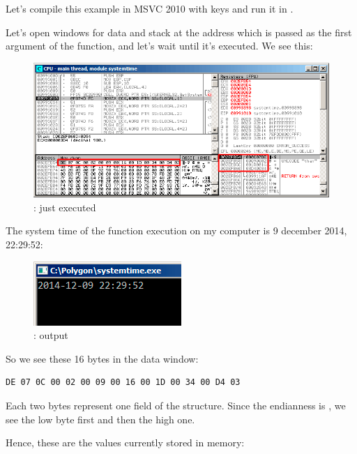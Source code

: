 ﻿\clearpage
\subsectionold{\olly}
\myindex{\olly}

Let's compile this example in MSVC 2010 with  keys and run it in \olly.

Let's open windows for data and stack at the address which is passed as the first argument of the
 function, and let's wait until it's executed. We see this:

\begin{figure}[H]
\centering
\includegraphics[scale=\FigScale]{patterns/15_structs/1_systemtime/olly_systemtime1.png}
\caption{\olly:  just executed}
\label{fig:struct_olly_1}
\end{figure}

The system time of the function execution on my computer is 9 december 2014, 22:29:52:

\begin{figure}[H]
\centering
\includegraphics[scale=\NormalScale]{patterns/15_structs/1_systemtime/olly_systemtime2.png}
\caption{\olly: \printf output}
\label{fig:struct_olly_2}
\end{figure}

So we see these 16 bytes in the
data window: 
\begin{lstlisting}
DE 07 0C 00 02 00 09 00 16 00 1D 00 34 00 D4 03
\end{lstlisting}

Each two bytes represent one field of the structure. 
Since the \gls{endianness} is , 
we see the low byte first and then the high one.

Hence, these are the values currently stored in memory:

